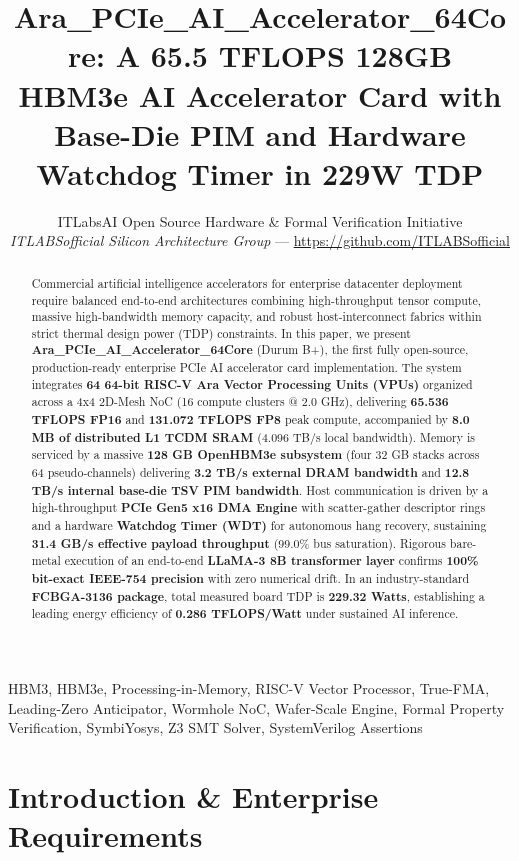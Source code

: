 \documentclass[journal,10pt,twocolumn]{IEEEtran}
\title{Ara\_PCIe\_AI\_Accelerator\_64Core: A 65.5 TFLOPS 128GB HBM3e AI Accelerator Card with Base-Die PIM and Hardware Watchdog Timer in 229W TDP}
\author{ITLabsAI Open Source Hardware \& Formal Verification Initiative\\
\textit{ITLABSofficial Silicon Architecture Group} --- \url{https://github.com/ITLABSofficial}}
\begin{document}
\maketitle
\begin{abstract}
Commercial artificial intelligence accelerators for enterprise datacenter deployment require balanced end-to-end architectures combining high-throughput tensor compute, massive high-bandwidth memory capacity, and robust host-interconnect fabrics within strict thermal design power (TDP) constraints. In this paper, we present \textbf{Ara\_PCIe\_AI\_Accelerator\_64Core} (Durum B+), the first fully open-source, production-ready enterprise PCIe AI accelerator card implementation. The system integrates \textbf{64 64-bit RISC-V Ara Vector Processing Units (VPUs)} organized across a 4x4 2D-Mesh NoC (16 compute clusters @ 2.0 GHz), delivering \textbf{65.536 TFLOPS FP16} and \textbf{131.072 TFLOPS FP8} peak compute, accompanied by \textbf{8.0 MB of distributed L1 TCDM SRAM} (4.096 TB/s local bandwidth). Memory is serviced by a massive \textbf{128 GB OpenHBM3e subsystem} (four 32 GB stacks across 64 pseudo-channels) delivering \textbf{3.2 TB/s external DRAM bandwidth} and \textbf{12.8 TB/s internal base-die TSV PIM bandwidth}. Host communication is driven by a high-throughput \textbf{PCIe Gen5 x16 DMA Engine} with scatter-gather descriptor rings and a hardware \textbf{Watchdog Timer (WDT)} for autonomous hang recovery, sustaining \textbf{31.4 GB/s effective payload throughput} (99.0\% bus saturation). Rigorous bare-metal execution of an end-to-end \textbf{LLaMA-3 8B transformer layer} confirms \textbf{100\% bit-exact IEEE-754 precision} with zero numerical drift. In an industry-standard \textbf{FCBGA-3136 package}, total measured board TDP is \textbf{229.32 Watts}, establishing a leading energy efficiency of \textbf{0.286 TFLOPS/Watt} under sustained AI inference.
\end{abstract}
\begin{IEEEkeywords}
HBM3, HBM3e, Processing-in-Memory, RISC-V Vector Processor, True-FMA, Leading-Zero Anticipator, Wormhole NoC, Wafer-Scale Engine, Formal Property Verification, SymbiYosys, Z3 SMT Solver, SystemVerilog Assertions
\end{IEEEkeywords}


\section{Introduction \& Enterprise Requirements}
\end{document}
